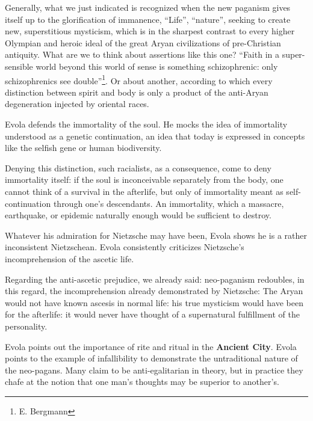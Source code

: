 Generally, what we just indicated is recognized when the new paganism gives itself up to the glorification of immanence, ``Life'', ``nature'', seeking to create new, superstitious mysticism, which is in the sharpest contrast to every higher Olympian and heroic ideal of the great Aryan civilizations of pre-Christian antiquity. What are we to think about assertions like this one? ``Faith in a super-sensible world beyond this world of sense is something schizophrenic: only schizophrenics see double''\footnote{E. Bergmann}. Or about another, according to which every distinction between spirit and body is only a product of the anti-Aryan degeneration injected by oriental races.

\begin{quotex}
Evola defends the immortality of the soul. He mocks the idea of immortality understood as a genetic continuation, an idea that today is expressed in concepts like the selfish gene or human biodiversity.
\end{quotex}

Denying this distinction, such racialists, as a consequence, come to deny immortality itself: if the soul is inconceivable separately from the body, one cannot think of a survival in the afterlife, but only of immortality meant as self-continuation through one's descendants. An immortality, which a massacre, earthquake, or epidemic naturally enough would be sufficient to destroy.

\begin{quotex}
Whatever his admiration for Nietzsche may have been, Evola shows he is a rather inconsistent Nietzschean. Evola consistently criticizes Nietzsche's incomprehension of the ascetic life.
\end{quotex}

Regarding the anti-ascetic prejudice, we already said: neo-paganism redoubles, in this regard, the incomprehension already demonstrated by Nietzsche: The Aryan would not have known ascesis in normal life: his true mysticism would have been for the afterlife: it would never have thought of a supernatural fulfillment of the personality.

\begin{quotex}
Evola points out the importance of rite and ritual in the \textbf{Ancient City}. Evola points to the example of infallibility to demonstrate the untraditional nature of the neo-pagans. Many claim to be anti-egalitarian in theory, but in practice they chafe at the notion that one man's thoughts may be superior to another's.
\end{quotex}

